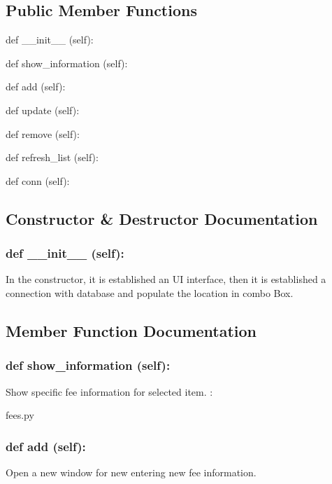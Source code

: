 \subsection*{Public Member Functions}
\begin{DoxyCompactItemize}
\item 
def {\_\_init\_\_} (self):
\item 
def {show\_information} (self):
\item 
def {add} (self):
\item 
def {update} (self):
\item 
def {remove} (self):
\item 
def {refresh\_list} (self):
\item 
def {conn} (self):
\end{DoxyCompactItemize}

\subsection{Constructor \& Destructor Documentation}
\hypertarget{class_poly_aa3def076b74bed67904976ad4f9fe9b1}{
\subsubsection[{def __init__ (self):}]{\setlength{\rightskip}{0pt plus 5cm}def {\_\_init\_\_} (self): 
}}
In the constructor, it is established an UI interface, then it is  established a connection with database and populate the location in combo Box.
 

\subsection{Member Function Documentation}
\hypertarget{class_poly_a14a7ad77ce612b0c54f531d307ee4b39}{
\subsubsection[{def show_information (self):}]{\setlength{\rightskip}{0pt plus 5cm}def {show\_information} (self):}}
Show specific fee information for selected item. 
:\begin{DoxyCompactItemize}
\item 
fees.\-py\end{DoxyCompactItemize}

\hypertarget{class_poly_a14a7ad77ce612b0c54f531d307ee4b39}{
\subsubsection[{def add (self):}]{\setlength{\rightskip}{0pt plus 5cm}def {add} (self):}}\label{class_poly_a14a7ad77ce612b0c54f531d307ee4b39}
Open a new window for new entering new fee information.

